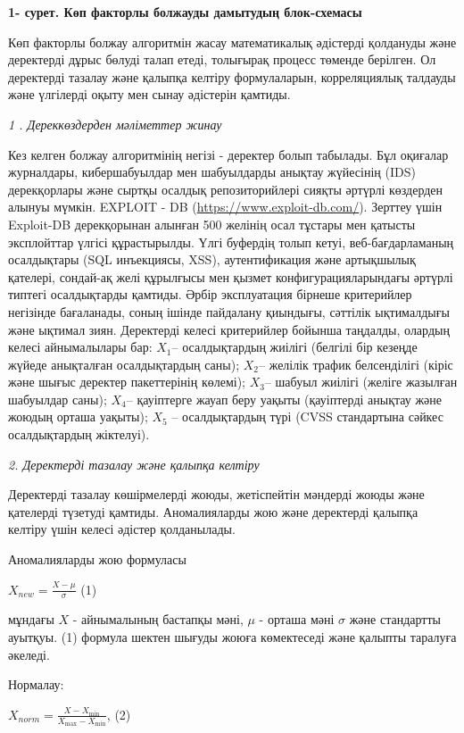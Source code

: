 \documentclass[
]{article}
\begin{document}
\textbf{1- сурет. Көп факторлы болжауды дамытудың блок-схемасы}

Көп факторлы болжау алгоритмін жасау математикалық әдістерді қолдануды
және деректерді дұрыс бөлуді талап етеді, толығырақ процесс төменде
берілген. Ол деректерді тазалау және қалыпқа келтіру формулаларын,
корреляциялық талдауды және үлгілерді оқыту мен сынау әдістерін қамтиды.

\emph{1 . Дереккөздерден мәліметтер жинау}

Кез келген болжау алгоритмінің негізі - деректер болып табылады. Бұл
оқиғалар журналдары, кибершабуылдар мен шабуылдарды анықтау жүйесінің
(IDS) дерекқорлары және сыртқы осалдық репозиторийлері сияқты әртүрлі
көздерден алынуы мүмкін. EXPLOIT - DB
(\href{https://www.exploit-db.com/\%20}{\ul{https://www.exploit-db.com/}}).
Зерттеу үшін Exploit-DB дерекқорынан алынған 500 желінің осал тұстары
мен қатысты эксплойттар үлгісі құрастырылды. Үлгі буфердің толып кетуі,
веб-бағдарламаның осалдықтары (SQL инъекциясы, XSS), аутентификация және
артықшылық қателері, сондай-ақ желі құрылғысы мен қызмет
конфигурацияларындағы әртүрлі типтегі осалдықтарды қамтиды. Әрбір
эксплуатация бірнеше критерийлер негізінде бағаланады, соның ішінде
пайдалану қиындығы, сәттілік ықтималдығы және ықтимал зиян. Деректерді
келесі критерийлер бойынша таңдалды, олардың келесі айнымалылары бар:
\(X_{1}\)-- осалдықтардың жиілігі (белгілі бір кезеңде жүйеде анықталған
осалдықтардың саны); \(X_{2}\)-- желілік трафик белсенділігі (кіріс және
шығыс деректер пакеттерінің көлемі); \(X_{3}\)-- шабуыл жиілігі (желіге
жазылған шабуылдар саны); \(X_{4}\)-- қауіптерге жауап беру уақыты
(қауіптерді анықтау және жоюдың орташа уақыты); \(X_{5}\) --
осалдықтардың түрі (CVSS стандартына сәйкес осалдықтардың жіктелуі).

\emph{2. Деректерді тазалау және қалыпқа келтіру}

Деректерді тазалау көшірмелерді жоюды, жетіспейтін мәндерді жоюды және
қателерді түзетуді қамтиды. Аномалияларды жою және деректерді қалыпқа
келтіру үшін келесі әдістер қолданылады.

Аномалияларды жою формуласы

\(X_{new} = \frac{X - \mu}{\sigma}\) (1)

мұндағы \(X\) - айнымалының бастапқы мәні, \(\mu\) - орташа мәні
\(\sigma\) және стандартты ауытқуы. (1) формула шектен шығуды жоюға
көмектеседі және қалыпты таралуға әкеледі.

Нормалау:

\(X_{norm} = \frac{X - X_{\min}}{X_{\max} - X_{\min}}\), (2)
\end{document}
